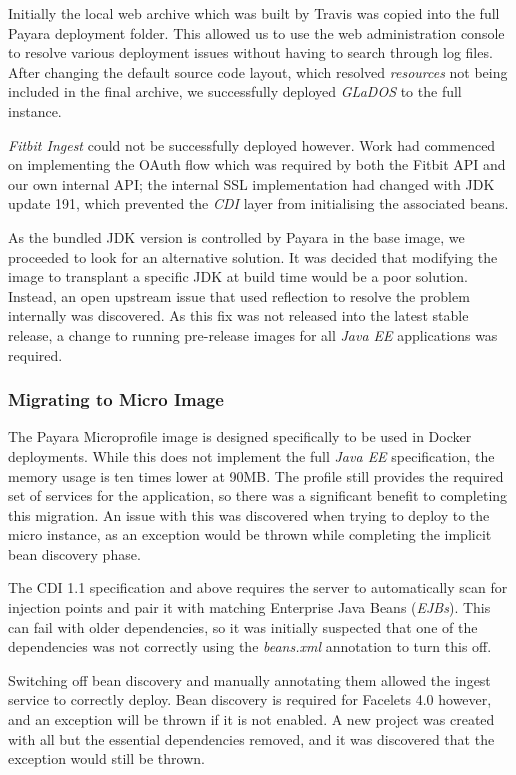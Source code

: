 Initially the local web archive which was built by Travis was copied into the full Payara deployment folder. This allowed us to use the web administration console to resolve various deployment issues without having to search through log files. After changing the default source code layout, which resolved \textit{resources} not being included in the final archive, we successfully deployed \textit{GLaDOS} to the full instance.

\textit{Fitbit Ingest} could not be successfully deployed however. Work had commenced on implementing the OAuth flow which was required by both the Fitbit API and our own internal API; the internal SSL implementation had changed with JDK update 191, which prevented the \textit{CDI} layer from initialising the associated beans.

As the bundled JDK version is controlled by Payara in the base image, we proceeded to look for an alternative solution. It was decided that modifying the image to transplant a specific JDK at build time would be a poor solution. Instead, an open upstream issue\cite{payara_ssl_issue} that used reflection to resolve the problem internally was discovered. As this fix was not released into the latest stable release, a change to running pre-release images for all \textit{Java EE} applications was required.

\subsubsection{Migrating to Micro Image}
The Payara Microprofile image is designed specifically to be used in Docker deployments. While this does not implement the full \textit{Java EE} specification, the memory usage is ten times lower at 90MB. The profile still provides the required set of services for the application, so there was a significant benefit to completing this migration. An issue with this was discovered when trying to deploy to the micro instance, as an exception would be thrown while completing the implicit bean discovery phase.

The CDI 1.1 specification and above requires the server to automatically scan for injection points and pair it with matching Enterprise Java Beans (\textit{EJBs}). This can fail with older dependencies, so it was initially suspected that one of the dependencies was not correctly using the \textit{beans.xml} annotation to turn this off.

Switching off bean discovery and manually annotating them allowed the ingest service to correctly deploy. Bean discovery is required for Facelets 4.0 however, and an exception will be thrown if it is not enabled. A new project was created with all but the essential dependencies removed, and it was discovered that the exception would still be thrown.


